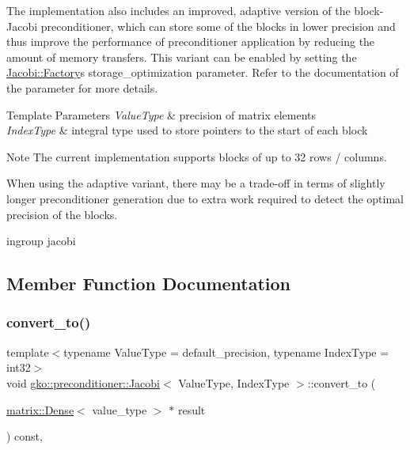 The implementation also includes an improved, adaptive version of the block-\/\+Jacobi preconditioner, which can store some of the blocks in lower precision and thus improve the performance of preconditioner application by reducing the amount of memory transfers. This variant can be enabled by setting the \hyperlink{classgko_1_1preconditioner_1_1Jacobi_1_1Factory}{Jacobi\+::\+Factory}\textquotesingle{}s {\ttfamily storage\+\_\+optimization} parameter. Refer to the documentation of the parameter for more details.


\begin{DoxyTemplParams}{Template Parameters}
{\em Value\+Type} & precision of matrix elements \\
\hline
{\em Index\+Type} & integral type used to store pointers to the start of each block\\
\hline
\end{DoxyTemplParams}
\begin{DoxyNote}{Note}
The current implementation supports blocks of up to 32 rows / columns. 

When using the adaptive variant, there may be a trade-\/off in terms of slightly longer preconditioner generation due to extra work required to detect the optimal precision of the blocks.
\end{DoxyNote}
ingroup jacobi 

\subsection{Member Function Documentation}
\mbox{\label{classgko_1_1preconditioner_1_1Jacobi_a54ce952ac4a12c3f4686442375cd4dc8}} 
\subsubsection{\texorpdfstring{convert\+\_\+to()}{convert\_to()}}
{\footnotesize\ttfamily template$<$typename Value\+Type  = default\+\_\+precision, typename Index\+Type  = int32$>$ \\
void \hyperlink{classgko_1_1preconditioner_1_1Jacobi}{gko\+::preconditioner\+::\+Jacobi}$<$ Value\+Type, Index\+Type $>$\+::convert\+\_\+to (\begin{DoxyParamCaption}\item[{\hyperlink{classgko_1_1matrix_1_1Dense}{matrix\+::\+Dense}$<$ value\+\_\+type $>$ $\ast$}]{result }\end{DoxyParamCaption}) const\hspace{0.3cm}{\ttfamily [override]}, {\ttfamily [virtual]}}



